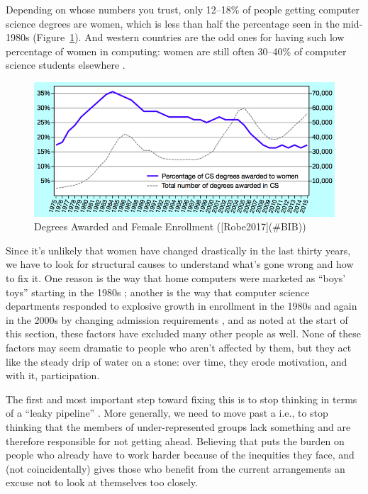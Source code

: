 Depending on whose numbers you trust, only 12--18\% of people getting
computer science degrees are women, which is less than half the
percentage seen in the mid-1980s (Figure~\ref{f:motivation-gender}). And
western countries are the odd ones for having such low percentage of
women in computing: women are still often 30--40\% of computer science
students elsewhere \cite{Galp2002,Varm2015}.

\begin{figure}
\centering
\includegraphics{../../figures/enrollment.png}
\caption{Degrees Awarded and Female Enrollment ({[}Robe2017{]}(\#BIB))}
\label{f:motivation-gender}
\end{figure}

Since it's unlikely that women have changed drastically in the last
thirty years, we have to look for structural causes to understand what's
gone wrong and how to fix it. One reason is the way that home computers
were marketed as ``boys' toys'' starting in the 1980s \cite{Marg2003};
another is the way that computer science departments responded to
explosive growth in enrollment in the 1980s and again in the 2000s by
changing admission requirements \cite{Robe2017}, and as noted at the
start of this section, these factors have excluded many other people as
well. None of these factors may seem dramatic to people who aren't
affected by them, but they act like the steady drip of water on a stone:
over time, they erode motivation, and with it, participation.

The first and most important step toward fixing this is to stop thinking
in terms of a ``leaky pipeline'' \cite{Mill2015}. More generally, we need to
move past a  i.e., to stop
thinking that the members of under-represented groups lack something and
are therefore responsible for not getting ahead. Believing that puts the
burden on people who already have to work harder because of the
inequities they face, and (not coincidentally) gives those who benefit
from the current arrangements an excuse not to look at themselves too
closely.


